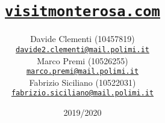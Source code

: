 \title{\href{https://www.visitmonterosa.com/}{\texttt{visitmonterosa.com}}}
\author{
    Davide Clementi (10457819)\\[0cm]
    {\small \href{mailto:davide2.clementi@mail.polimi.it}{\texttt{davide2.clementi@mail.polimi.it}}}
    \\[0.5cm]
    Marco Premi (10526255)\\[0cm]
    {\small \href{mailto:marco.premi@mail.polimi.it}{\texttt{marco.premi@mail.polimi.it}}}
    \\[0.5cm]
    Fabrizio Siciliano (10522031)\\[0cm]
    {\small \href{mailto:fabrizio.siciliano@mail.polimi.it}{\texttt{fabrizio.siciliano@mail.polimi.it}}}
}
\date{2019/2020} 